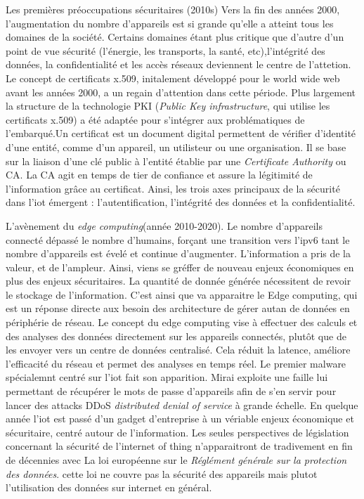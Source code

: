 Les premières préoccupations sécuritaires (2010s)
Vers la fin des années 2000, l'augmentation du nombre d'appareils est si grande qu'elle a atteint tous les domaines de la société. Certains domaines étant plus critique que d'autre d'un point de vue sécurité (l'énergie, les transports, la santé, etc),l'intégrité des données, la confidentialité et les accès réseaux deviennent le centre de l'attetion. 
Le concept de certificats x.509, initalement développé pour le world wide web avant les années 2000, a un regain d'attention dans cette période. Plus largement la structure de la technologie PKI (\textit{Public Key infrastructure}, qui utilise les certificats x.509) a été adaptée pour s'intégrer aux problématiques de l'embarqué.Un certificat est un document digital permettent de vérifier d'identité d'une entité, comme d'un appareil, un utilisteur ou une organisation. Il se base sur la liaison d'une clé public à l'entité établie par une \textit{Certificate Authority} ou CA. La CA agit en temps de tier de confiance et assure la légitimité de l'information grâce au certificat. Ainsi, les trois axes principaux de la sécurité dans l'iot émergent : l'autentification, l'intégrité des données et la confidentialité.


L'avènement du \textit{edge computing}(année 2010-2020).
Le nombre d'appareils connecté  dépassé le nombre d'humains, forçant une transition vers l'ipv6 tant le nombre d'appareils est évelé et continue d'augmenter. L'information a pris de la valeur, et de l'ampleur. Ainsi, viens se gréffer de nouveau enjeux économiques en plus des enjeux sécuritaires. La quantité de donnée générée nécessitent de revoir le stockage de l'information. C'est ainsi que va apparaitre le Edge computing, qui est un réponse directe aux besoin des architecture de gérer autan de données en périphérie de réseau. Le concept du edge computing vise à effectuer des calculs et des analyses des données directement sur les appareils connectés, plutôt que de les envoyer vers un centre de données centralisé. Cela réduit la latence, améliore l'efficacité du réseau et permet des analyses en temps réel. Le premier malware spécialemnt centré sur l'iot fait son apparition. Mirai exploite une faille lui permettant de récupérer le mots de passe d'appareils afin de s'en servir pour lancer des attacks DDoS \textit{distributed denial of service} à grande échelle. En quelque année l'iot est passé d'un gadget d'entreprise à un vériable enjeux économique et sécuritaire, centré autour de l'information. Les seules perspectives de législation concernant la sécurité de l'internet of thing n'apparaitront de tradivement en fin de décennies avec La loi européenne sur le \textit{Réglément générale sur la protection des données}. cette loi ne couvre pas la sécurité des appareils mais plutot l'utilisation des données sur internet en général.


